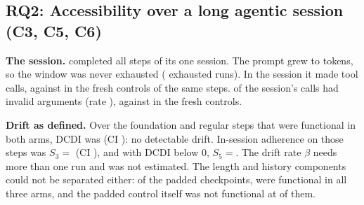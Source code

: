 \subsection{RQ2: Accessibility over a long agentic session (C3, C5, C6)}\label{sec:rq2}
\textbf{The session.} \Q{} completed all  steps of its one
session. The prompt grew to  tokens, so the window was never
exhausted ( exhausted runs). In the session it made
 tool calls, against 
in the fresh controls of the same steps.  of the session's
calls had invalid arguments (rate ), against
 in the fresh controls.

\textbf{Drift as defined.} Over the  foundation and regular steps that
were functional in both arms, DCDI was  (CI ):
no detectable drift. In-session adherence on those steps was $S_3={}$ (CI
), and with DCDI below 0, $S_5={}$. The drift rate $\beta$ needs more
than one run and was not estimated. The length and history components could not be separated
either: of the  padded checkpoints, 
were functional in all three arms, and the padded control itself was not functional at
 of them.

